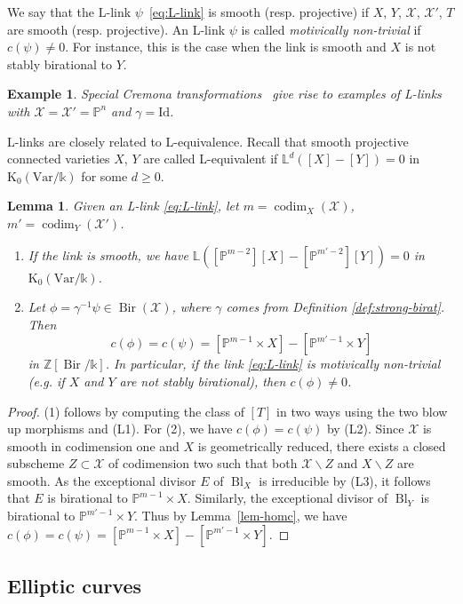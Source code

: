 \documentclass[a4paper,12pt]{amsart}
\def\k{\mathbb k}
\def\L{\mathbb L}
\def\P{\mathbb P}
\def\Z{\mathbb Z}
\def\XX{\mathcal X}
\def\Bl{{\operatorname{Bl}}}
\def\codim{{\operatorname{codim}}}
\def\Bir{{\operatorname{Bir}}}
\def\Kt{{\mathrm{K}}}
\def\Id{{\mathrm{Id}}}
\def\Var{{\mathrm{Var}}}
\theoremstyle{plain}
\newtheorem{lemma}[dummy]{Lemma}
\newtheorem{example}[dummy]{Example}
\numberwithin{equation}{section}
\theoremstyle{definition}
\newcommand{\cX}{\mathcal{X}}
\newcommand{\bss}{\backslash}
\renewcommand{\(}{\left(}
\renewcommand{\)}{\right)}
\begin{document}
We say that the L-link $\psi$~\eqref{eq:L-link} is smooth 
(resp. projective)
if $X$, $Y$, $\cX$, $\cX'$, $T$
are smooth (resp. projective).
An L-link $\psi$
is called \emph{motivically non-trivial} if $c(\psi) \ne 0$.
For instance, this is the case when 
the link is smooth and
$X$ is not stably birational to $Y$.


\begin{example}
Special Cremona transformations~\cite{Crauder-Katz} give rise
to examples of L-links with
$\cX = \cX' = \P^n$
and $\gamma = \Id$. 
\end{example}

L-links are closely related to L-equivalence.
Recall that smooth
projective connected
varieties
$X$, $Y$
are
called
L-equivalent
if $\L^d([X]-[Y]) = 0$
in $\Kt_0(\Var/\k)$
for some $d \ge 0$.

\begin{lemma}\label{lemma:L-link}
Given an L-link \eqref{eq:L-link},
let $m = \codim_X(\XX)$,
$m' = \codim_Y(\XX')$. 
\begin{enumerate}
\item If the link is smooth, we have 
$\L([\P^{m-2}][X] - [\P^{m'-2}][Y]) = 0$ in $\Kt_0(\Var/\k)$.
\item Let $\phi = \gamma^{-1} \psi 
\in \Bir(\XX)$, where $\gamma$ comes from Definition \ref{def:strong-birat}.
Then 
$$c(\phi) = c(\psi) = [\P^{m-1} \times X] - [\P^{m'-1} \times Y]$$
in $\Z[\Bir/\k]$.
In particular, if the link \eqref{eq:L-link} is motivically non-trivial
(e.g. if $X$ and $Y$ are not stably
birational), then $c(\phi) \ne 0$.
\end{enumerate}
\end{lemma}
\begin{proof}
(1) follows by computing the class
of $[T]$ in two ways using the two
blow up morphisms and (L1).
For (2), we have $c(\phi) = c(\psi)$ by
(L2). 
Since $\cX$ is smooth in codimension one
and $X$ is geometrically reduced,
there exists a closed subscheme $Z \subset \cX$ of codimension two
such that both $\cX \bss Z$ and $X \bss Z$ are smooth.
As the exceptional divisor $E$ of $\Bl_{X}$
is irreducible by (L3), 
it follows that $E$ is birational to $\P^{m-1} \times X$.
Similarly,
the exceptional divisor of $\Bl_{Y}$
is birational to $\P^{m'-1} \times Y$.
Thus by Lemma~\ref{lem-homc}, we have
$c(\phi) = c(\psi) =  [\P^{m-1} \times X] - [\P^{m'-1} \times Y]$.
\end{proof}


\subsection{Elliptic curves}\label{ssec-dim3}
\hfill
\end{document}
